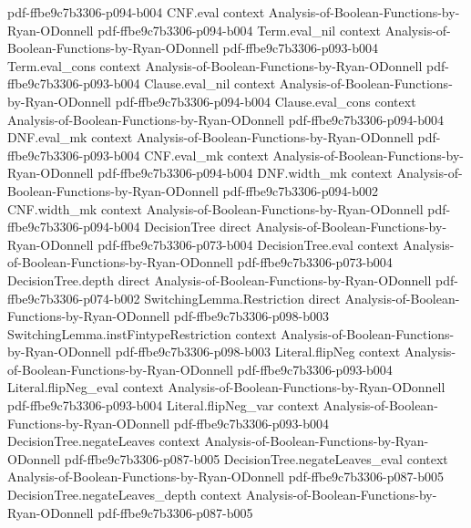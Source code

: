 \begin{theorem}
  {pdf-ffbe9c7b3306-p094-b004}
\proofstep
  {CNF.eval}
  {context}
  {Analysis-of-Boolean-Functions-by-Ryan-ODonnell}
  {pdf-ffbe9c7b3306-p094-b004}
\proofstep
  {Term.eval_nil}
  {context}
  {Analysis-of-Boolean-Functions-by-Ryan-ODonnell}
  {pdf-ffbe9c7b3306-p093-b004}
\proofstep
  {Term.eval_cons}
  {context}
  {Analysis-of-Boolean-Functions-by-Ryan-ODonnell}
  {pdf-ffbe9c7b3306-p093-b004}
\proofstep
  {Clause.eval_nil}
  {context}
  {Analysis-of-Boolean-Functions-by-Ryan-ODonnell}
  {pdf-ffbe9c7b3306-p094-b004}
\proofstep
  {Clause.eval_cons}
  {context}
  {Analysis-of-Boolean-Functions-by-Ryan-ODonnell}
  {pdf-ffbe9c7b3306-p094-b004}
\proofstep
  {DNF.eval_mk}
  {context}
  {Analysis-of-Boolean-Functions-by-Ryan-ODonnell}
  {pdf-ffbe9c7b3306-p093-b004}
\proofstep
  {CNF.eval_mk}
  {context}
  {Analysis-of-Boolean-Functions-by-Ryan-ODonnell}
  {pdf-ffbe9c7b3306-p094-b004}
\proofstep
  {DNF.width_mk}
  {context}
  {Analysis-of-Boolean-Functions-by-Ryan-ODonnell}
  {pdf-ffbe9c7b3306-p094-b002}
\proofstep
  {CNF.width_mk}
  {context}
  {Analysis-of-Boolean-Functions-by-Ryan-ODonnell}
  {pdf-ffbe9c7b3306-p094-b004}
\proofstep
  {DecisionTree}
  {direct}
  {Analysis-of-Boolean-Functions-by-Ryan-ODonnell}
  {pdf-ffbe9c7b3306-p073-b004}
\proofstep
  {DecisionTree.eval}
  {context}
  {Analysis-of-Boolean-Functions-by-Ryan-ODonnell}
  {pdf-ffbe9c7b3306-p073-b004}
\proofstep
  {DecisionTree.depth}
  {direct}
  {Analysis-of-Boolean-Functions-by-Ryan-ODonnell}
  {pdf-ffbe9c7b3306-p074-b002}
\proofstep
  {SwitchingLemma.Restriction}
  {direct}
  {Analysis-of-Boolean-Functions-by-Ryan-ODonnell}
  {pdf-ffbe9c7b3306-p098-b003}
\proofstep
  {SwitchingLemma.instFintypeRestriction}
  {context}
  {Analysis-of-Boolean-Functions-by-Ryan-ODonnell}
  {pdf-ffbe9c7b3306-p098-b003}
\proofstep
  {Literal.flipNeg}
  {context}
  {Analysis-of-Boolean-Functions-by-Ryan-ODonnell}
  {pdf-ffbe9c7b3306-p093-b004}
\proofstep
  {Literal.flipNeg_eval}
  {context}
  {Analysis-of-Boolean-Functions-by-Ryan-ODonnell}
  {pdf-ffbe9c7b3306-p093-b004}
\proofstep
  {Literal.flipNeg_var}
  {context}
  {Analysis-of-Boolean-Functions-by-Ryan-ODonnell}
  {pdf-ffbe9c7b3306-p093-b004}
\proofstep
  {DecisionTree.negateLeaves}
  {context}
  {Analysis-of-Boolean-Functions-by-Ryan-ODonnell}
  {pdf-ffbe9c7b3306-p087-b005}
\proofstep
  {DecisionTree.negateLeaves_eval}
  {context}
  {Analysis-of-Boolean-Functions-by-Ryan-ODonnell}
  {pdf-ffbe9c7b3306-p087-b005}
\proofstep
  {DecisionTree.negateLeaves_depth}
  {context}
  {Analysis-of-Boolean-Functions-by-Ryan-ODonnell}
  {pdf-ffbe9c7b3306-p087-b005}
\proofstep

\end{theorem}
